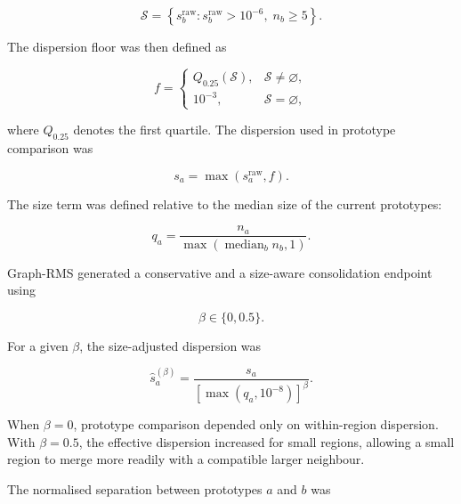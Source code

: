 \documentclass[10pt,a4paper,fleqn]{article}
\begin{document}
\begin{equation}
\mathcal{S}
=
\left\{
s_b^{\mathrm{raw}}:
s_b^{\mathrm{raw}}>10^{-6},
\;
n_b\geq5
\right\}.
\label{eq:dispersion_reference_set}
\end{equation}

The dispersion floor was then defined as

\begin{equation}
f
=
\begin{cases}
Q_{0.25}\!\left(\mathcal{S}\right),
&
\mathcal{S}\neq\varnothing,
\\[4pt]
10^{-3},
&
\mathcal{S}=\varnothing,
\end{cases}
\label{eq:dispersion_floor}
\end{equation}

where \(Q_{0.25}\) denotes the first quartile. The dispersion used in prototype
comparison was

\begin{equation}
s_a
=
\max
\left(
s_a^{\mathrm{raw}},f
\right).
\label{eq:floored_dispersion}
\end{equation}

The size term was defined relative to the median size of the current
prototypes:

\begin{equation}
q_a
=
\frac{
n_a
}{
\max\left(
\operatorname{median}_{b}n_b,1
\right)
}.
\label{eq:prototype_size_ratio}
\end{equation}

Graph-RMS generated a conservative and a size-aware consolidation endpoint
using

\begin{equation}
\beta\in\{0,0.5\}.
\label{eq:size_exponents}
\end{equation}

For a given \(\beta\), the size-adjusted dispersion was

\begin{equation}
\widehat{s}_a^{(\beta)}
=
\frac{s_a}{
\left[
\max\left(q_a,10^{-8}\right)
\right]^{\beta}
}.
\label{eq:size_adjusted_dispersion}
\end{equation}

When \(\beta=0\), prototype comparison depended only on within-region
dispersion. With \(\beta=0.5\), the effective dispersion increased for small
regions, allowing a small region to merge more readily with a compatible
larger neighbour.

The normalised separation between prototypes \(a\) and \(b\) was
\end{document}
